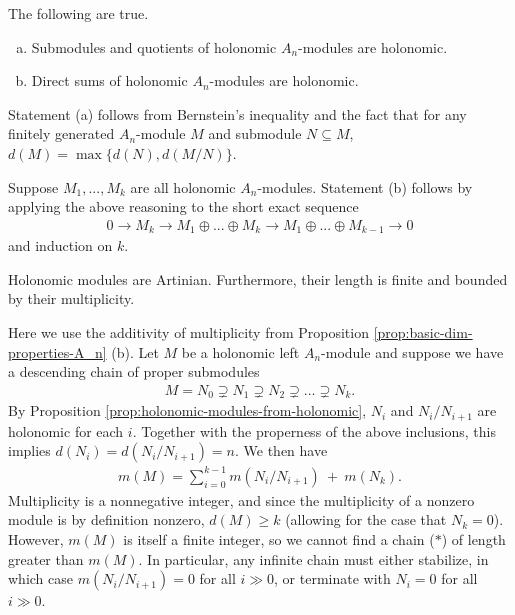 \begin{prop}\label{prop:holonomic-modules-from-holonomic}
	The following are true.
	\begin{enumerate}[(a)]
		\item Submodules and quotients of holonomic $A_n$-modules are holonomic.
		\item Direct sums of holonomic $A_n$-modules are holonomic.
	\end{enumerate}
\end{prop}
\begin{prf}
	Statement (a) follows from Bernstein's inequality and the fact that for any finitely generated $A_n$-module $M$ and submodule $N \subseteq M$, $d(M) = \max\{d(N),d(M/N)\}$.

	Suppose $M_1,...,M_k$ are all holonomic $A_n$-modules. Statement (b) follows by applying the above reasoning to the short exact sequence
	\begin{align*}
		0 \to M_k \to M_1\oplus...\oplus M_k \to M_1\oplus ...\oplus M_{k-1} \to 0
	\end{align*}
	and induction on $k$.
\end{prf}
\begin{prop}\label{prop:holonomic-mods-are-artinian}
	Holonomic modules are Artinian. Furthermore, their length is finite and bounded by their multiplicity.
\end{prop}
\begin{prf}
	Here we use the additivity of multiplicity from Proposition \ref{prop:basic-dim-properties-A_n} (b). Let $M$ be a holonomic left $A_n$-module and suppose we have a descending chain of proper submodules
	\begin{align}\tag{$\ast$}
		M = N_0 \supsetneq N_1 \supsetneq N_2 \supsetneq \dots \supsetneq N_k.
	\end{align}
	By Proposition \ref{prop:holonomic-modules-from-holonomic}, $N_i$ and $N_i/N_{i+1}$ are holonomic for each $i$. Together with the properness of the above inclusions, this implies $d(N_i) = d(N_i/N_{i+1}) = n$. We then have
	\begin{align*}
		m(M) = \sum_{i=0}^{k-1} m(N_{i}/N_{i+1}) ~ + ~ m(N_{k}).
	\end{align*}
	Multiplicity is a nonnegative integer, and since the multiplicity of a nonzero module is by definition nonzero, $d(M) \geq k$ (allowing for the case that $N_k = 0$). However, $m(M)$ is itself a finite integer, so we cannot find a chain ($\ast$) of length greater than $m(M)$. In particular, any infinite chain must either stabilize, in which case $m(N_i/N_{i+1}) = 0$ for all $i \gg 0$, or terminate with $N_i = 0$ for all $i\gg 0$.
\end{prf}

